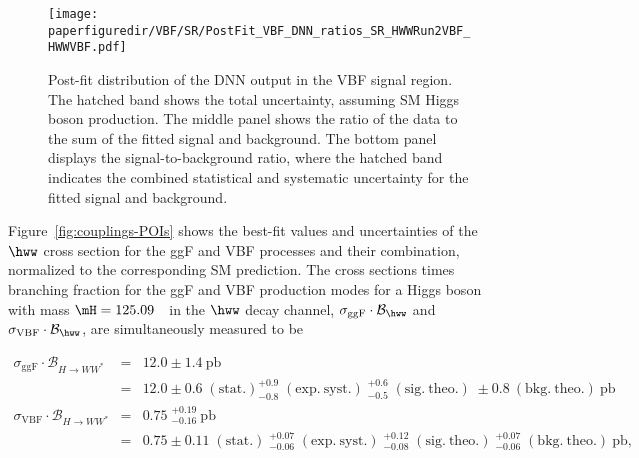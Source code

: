 \begin{figure}[htb]
\centering
\texttt{[image: \\paperfiguredir/VBF/SR/PostFit\_VBF\_DNN\_ratios\_SR\_HWWRun2VBF\_HWWVBF.pdf]}
\caption{
  Post-fit distribution of the DNN output in the VBF signal region.
  The hatched band shows the total uncertainty, assuming SM Higgs boson production.
  The middle panel shows the ratio of the data to the sum of the fitted signal and background.
  The bottom panel displays the signal-to-background ratio, where the hatched band indicates the combined statistical and systematic uncertainty for the fitted signal and background.
}
\label{fig:VBF_DNN}
\end{figure}



Figure~\ref{fig:couplings-POIs} shows the best-fit values and uncertainties of the $\hww$ cross section for the ggF and VBF processes and their combination, normalized to the corresponding SM prediction.
The cross sections times branching fraction for the ggF and VBF production modes for a Higgs boson with mass $\mH=125.09$~\GeV\ in the $\hww$ decay channel, $\sigma_{\mathrm{ggF}} \cdot \mathcal{B}_{\hww}$ and $\sigma_{\mathrm{VBF}} \cdot \mathcal{B}_{\hww}$, are simultaneously measured to be

\begin{eqnarray*}
\sigma_{\mathrm{ggF}} \cdot \mathcal{B}_{H \to WW^{\ast}} &=& 12.0 \pm 1.4~\mathrm{pb} \\
&=& 12.0 \pm 0.6\;(\mathrm{stat.}) ^{+0.9}_{-0.8}\;(\mathrm{exp.~syst.})\;^{+0.6}_{-0.5}\;(\mathrm{sig.~theo.})\; \pm 0.8~(\mathrm{bkg.~theo.})~\mathrm{pb} \\
\sigma_{\mathrm{VBF}} \cdot \mathcal{B}_{H \to WW^{\ast}} &=& 0.75\;^{+0.19}_{-0.16}~\mathrm{pb} \\
&=& 0.75 \pm 0.11\;(\mathrm{stat.})\;^{+0.07}_{-0.06}\;(\mathrm{exp.~syst.})\;^{+0.12}_{-0.08}\;(\mathrm{sig.~theo.})\;^{+0.07}_{-0.06}\;(\mathrm{bkg.~theo.})~\mathrm{pb},
\end{eqnarray*}

